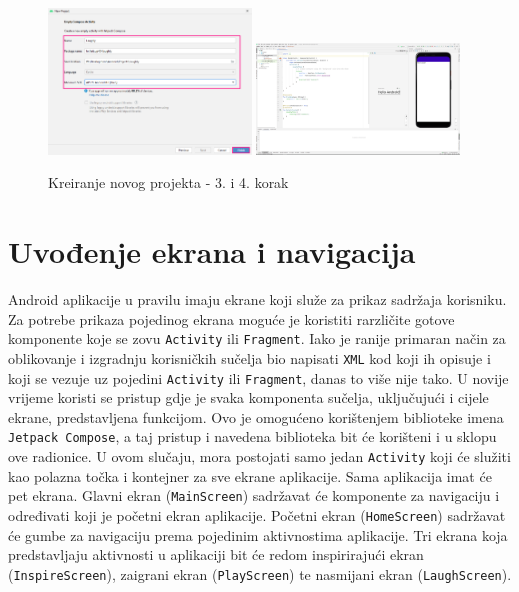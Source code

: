 \documentclass[11pt,a4paper,twoside]{article}
\begin{document}
	\begin{figure}[!h]
		\centering
		\includegraphics[width=0.48\textwidth]{new_project_03.png}
		\hfill
		\includegraphics[width=0.48\textwidth]{new_project_04.png}
		\caption{Kreiranje novog projekta - 3. i 4. korak}
		\label{fig:new_project_03}	
	\end{figure}

\section{Uvođenje ekrana i navigacija}

Android aplikacije u pravilu imaju ekrane koji služe za prikaz sadržaja korisniku. Za potrebe prikaza pojedinog ekrana moguće je koristiti rarzličite gotove komponente koje se zovu \texttt{Activity} ili \texttt{Fragment}. Iako je ranije primaran način za oblikovanje i izgradnju korisničkih sučelja bio napisati \texttt{XML} kod koji ih opisuje i koji se vezuje uz pojedini \texttt{Activity} ili \texttt{Fragment}, danas to više nije tako. U novije vrijeme koristi se pristup gdje je svaka komponenta sučelja, uključujući i cijele ekrane, predstavljena funkcijom. Ovo je omogućeno korištenjem biblioteke imena \texttt{Jetpack Compose}, a taj pristup i navedena biblioteka bit će korišteni i u sklopu ove radionice. U ovom slučaju, mora postojati samo jedan \texttt{Activity} koji će služiti kao polazna točka i kontejner za sve ekrane aplikacije. Sama aplikacija imat će pet ekrana. Glavni ekran (\texttt{MainScreen}) sadržavat će komponente za navigaciju i određivati koji je početni ekran aplikacije. Početni ekran (\texttt{HomeScreen}) sadržavat će gumbe za navigaciju prema pojedinim aktivnostima aplikacije. Tri ekrana koja predstavljaju aktivnosti u aplikaciji bit će redom inspirirajući ekran (\texttt{InspireScreen}), zaigrani ekran (\texttt{PlayScreen}) te nasmijani ekran (\texttt{LaughScreen}). 
\end{document}
